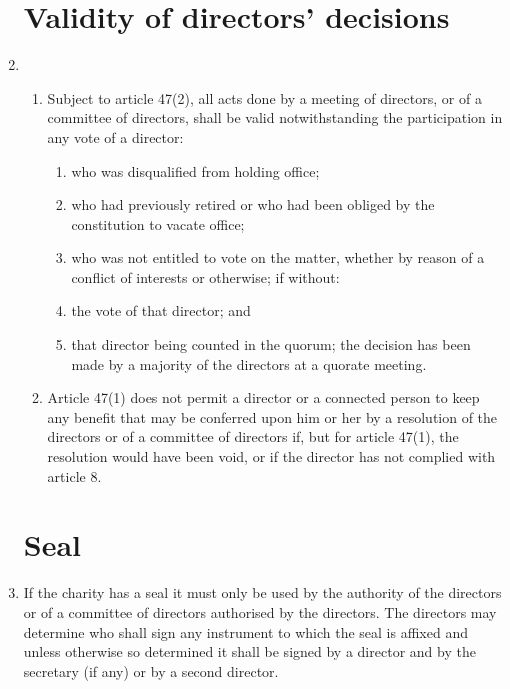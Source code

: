 \documentclass{article}
\begin{document}
\begin{enumerate}[label=\arabic*, start=23]
    \section{Validity of directors' decisions}
    \item \begin{enumerate}[label=(\arabic*)]
        \item Subject to article 47(2), all acts done by a meeting of directors,
        or of a committee of directors, shall be valid notwithstanding
        the participation in any vote of a director:
        \begin{enumerate}[label=(\alph*)]
        \item who was disqualified from holding office;
        \item who had previously retired or who had been obliged by
        the constitution to vacate office;
        \item who was not entitled to vote on the matter, whether by
        reason of a conflict of interests or otherwise;
        if without:
        \item the vote of that director; and
        \item that director being counted in the quorum;
        the decision has been made by a majority of the directors at a
        quorate meeting.
        \end{enumerate}
        \item Article 47(1) does not permit a director or a connected person
        to keep any benefit that may be conferred upon him or her by a
        resolution of the directors or of a committee of directors if, but
        for article 47(1), the resolution would have been void, or if the
        director has not complied with article 8.
    \end{enumerate}
    
    \section{Seal}
    \item If the charity has a seal it must only be used by the authority of the
    directors or of a committee of directors authorised by the directors. The
    directors may determine who shall sign any instrument to which the
    seal is affixed and unless otherwise so determined it shall be signed by
    a director and by the secretary (if any) or by a second director.
    

\end{enumerate}
\end{document}

